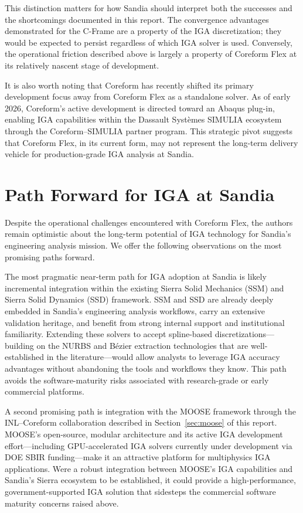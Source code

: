 \documentclass[12pt,report,justified]{SANDreport}
\begin{document}
This distinction matters for how Sandia should interpret both the successes and the
shortcomings documented in this report.  The convergence advantages demonstrated for the
C-Frame are a property of the IGA discretization; they would be expected to persist
regardless of which IGA solver is used.  Conversely, the operational
friction described above is largely a property of Coreform Flex at its relatively nascent  stage of
development.

It is also worth noting that Coreform has recently shifted its primary development focus
away from Coreform Flex as a standalone solver.  As of early 2026, Coreform's active
development is directed toward an Abaqus plug-in, enabling IGA capabilities within the
Dassault Syst\`{e}mes SIMULIA ecosystem through the Coreform--SIMULIA partner program.
This strategic pivot suggests that Coreform Flex, in its current form, may not represent
the long-term delivery vehicle for production-grade IGA analysis at Sandia.

\section{Path Forward for IGA at Sandia}

Despite the operational challenges encountered with Coreform Flex, the authors remain
optimistic about the long-term potential of IGA technology for Sandia's engineering
analysis mission.  We offer the following observations on the most promising paths
forward.

The most pragmatic near-term path for IGA adoption at Sandia is likely incremental
integration within the existing Sierra Solid Mechanics (SSM) and Sierra Solid Dynamics
(SSD) framework.  SSM and SSD are already deeply embedded in Sandia's engineering
analysis workflows, carry an extensive validation heritage, and benefit from strong
internal support and institutional familiarity.  Extending these solvers to accept
spline-based discretizations---building on the NURBS and B\'{e}zier extraction
technologies that are well-established in the literature---would allow analysts to
leverage IGA accuracy advantages without abandoning the tools and workflows they know.
This path avoids the software-maturity risks associated with research-grade or early
commercial platforms.

A second promising path is integration with the MOOSE framework through the
INL--Coreform collaboration described in Section~\ref{sec:moose} of this report.  MOOSE's
open-source, modular architecture and its active IGA development effort---including
GPU-accelerated IGA solvers currently under development via DOE SBIR funding---make it
an attractive platform for multiphysics IGA applications.  Were a robust integration between
MOOSE's IGA capabilities and Sandia's Sierra ecosystem to be established, it could
provide a high-performance, government-supported IGA solution that sidesteps the
commercial software maturity concerns raised above.
\end{document}
